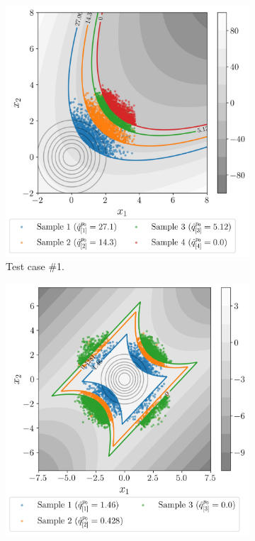 \begin{figure}
    \centering
    \begin{subfigure}[b]{0.49\linewidth}
        \centering
        \includegraphics[width=\linewidth]{part3/figures/BANCS/bancs_parabolic.jpg}
        \caption{Test case \#1.}
    \end{subfigure}
    \begin{subfigure}[b]{0.49\linewidth}
        \centering
        \includegraphics[width=\linewidth]{part3/figures/BANCS/bancs_4branch.jpg}

\end{subfigure}
\end{figure}
